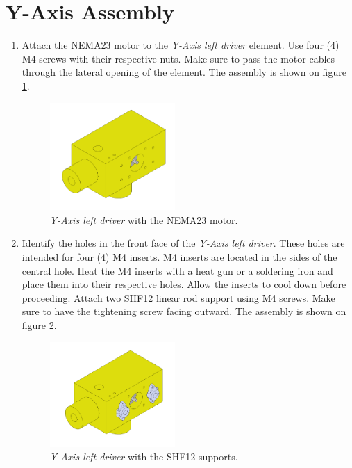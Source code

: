 \documentclass{article}
\begin{document}
\newpage
\section{Y-Axis Assembly}
\begin{enumerate}
    
    \item Attach the NEMA23 motor to the \textit{Y-Axis left driver} element. Use four (4) M4 screws with their respective nuts. Make sure to pass the motor cables through the lateral opening of the element. The assembly is shown on figure \ref{fig:ya_step_1}.
    
    \begin{figure}[H]
        \centering
        \includegraphics[width=0.45\textwidth]{images/y_axis/step_A.png}
        \caption{\textit{Y-Axis left driver} with the NEMA23 motor.}
        \label{fig:ya_step_1}
    \end{figure}
    
    \item Identify the holes in the front face of the \textit{Y-Axis left driver}. These holes are intended for four (4) M4 inserts. M4 inserts are located in the sides of the central hole. Heat the M4 inserts with a heat gun or a soldering iron and place them into their respective holes. Allow the inserts to cool down before proceeding. Attach two SHF12 linear rod support using M4 screws. Make sure to have the tightening screw facing outward. The assembly is shown on figure \ref{fig:ya_step_2}. 
    
    \begin{figure}[H]
        \centering
        \includegraphics[width=0.45\textwidth]{images/y_axis/step_B.png}
        \caption{\textit{Y-Axis left driver} with the SHF12 supports.}
        \label{fig:ya_step_2}
    \end{figure}
    

\end{enumerate}
\end{document}
